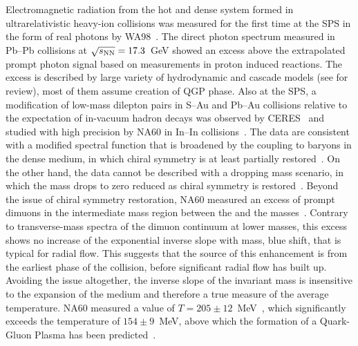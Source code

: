 \documentclass[../report.tex]{subfiles}
\begin{document}
Electromagnetic radiation from the hot and dense system formed in ultrarelativistic heavy-ion collisions was measured for the first time at the SPS in the form of real photons by WA98~\cite{Aggarwal:2000th}. The direct photon spectrum measured in Pb--Pb collisions at $\sqrt{s_{\rm NN}} = 17.3$~GeV showed an excess above the extrapolated prompt photon signal based on measurements in proton induced reactions. 
The excess is described by large variety of hydrodynamic and cascade models (see \cite{Peitzmann:2001mz} for review), most of them assume creation of QGP phase.
Also at the SPS, a modification of low-mass dilepton pairs in S--Au and Pb--Au collisions relative to the expectation of in-vacuum hadron decays was observed by CERES~\cite{Agakishiev:1995xb,Agakishiev:1997au,Agakichiev:2005ai,Adamova:2006nu} and studied with high precision by NA60 in In--In collisions~\cite{Arnaldi:2006jq,Arnaldi:2007ru,Arnaldi:2008fw,Specht:2010xu}. The data are consistent with a modified \Prho spectral function that is broadened by the coupling to baryons in the dense medium, in which chiral symmetry is at least partially restored~\cite{Rapp:1995zy,Rapp:1999us,Rapp:2009yu,Bazavov:2011nk,Hohler:2013eba}. On the other hand, the data cannot be described with a dropping mass scenario, in which the \Prho mass drops to zero reduced as chiral symmetry is restored~\cite{Brown:1991kk}. Beyond the issue of chiral symmetry restoration, NA60 measured an excess of prompt dimuons in the intermediate mass region between the \Pphi and the \PJpsi masses~\cite{Arnaldi:2007ru,Arnaldi:2008fw}. Contrary to transverse-mass spectra of the dimuon continuum at lower masses, this excess shows no increase of the exponential inverse slope with mass, \ie blue shift, that is typical for radial flow. This suggests that the source of this enhancement is from the earliest phase of the collision, before significant radial flow has built up. Avoiding the issue altogether, the inverse slope of the invariant mass is insensitive to the expansion of the medium and therefore a true measure of the average temperature. NA60 measured a value of $T=205\pm12$~MeV~\cite{Specht:2010xu}, which significantly exceeds the temperature of $154\pm9$~MeV, above which the formation of a Quark-Gluon Plasma has been predicted~\cite{Borsanyi:2010bp,Bazavov:2014pvz}.
\end{document}
